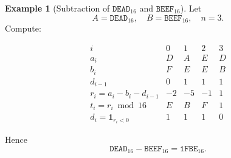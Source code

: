 \documentclass[11pt,a4paper]{article}
\theoremstyle{definition}
\newtheorem{example}{Example}[section]
\theoremstyle{remark}
\begin{document}
\begin{example}[Subtraction of $\texttt{DEAD}_{16}$ and $\texttt{BEEF}_{16}$]
	Let \[
	A = \texttt{DEAD}_{16},\quad B = \texttt{BEEF}_{16},\quad n=3.
	\]
	Compute: 
\begin{center}
	\begin{minipage}{.475\textwidth}\centering
	\end{minipage}\hfill
	\begin{minipage}{.475\textwidth} 	\[
		\begin{array}{c|cccc}
			i & 0 & 1 & 2 & 3 \\ \hline
			a_i & D & A & E & D \\
			b_i & F & E & E & B \\
			d_{i-1} & 0 & 1 & 1 & 1 \\
			r_i = a_i - b_i - d_{i-1} & -2 & -5 & -1 & 1 \\
			t_i = r_i\bmod16 & E & B & F & 1 \\
			d_i = \mathbf{1}_{r_i<0} & 1 & 1 & 1 & 0
		\end{array}
		\]
	\end{minipage}
\end{center}
	Hence \[
	\texttt{DEAD}_{16} - \texttt{BEEF}_{16} = \texttt{1FBE}_{16}.
	\]
\end{example}
\end{document}

